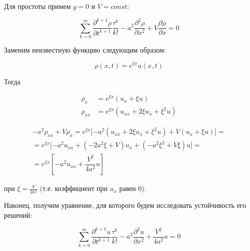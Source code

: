 Для простоты примем $g=0$ и $V=const$:

\begin{equation}
\sum\limits_{k=0}^{m} \dfrac{\partial^{k+1} \rho}{\partial t^{k+1}} \dfrac{\tau^k}{k!} - a^2 \dfrac{\partial^2 \rho}{\partial x^2} + V \dfrac{\partial \rho}{\partial x} = 0
\end{equation}

Заменим неизвестную функцию следующим образом:

\begin{equation*}
\rho (x,t) = e^{\xi x} u(x,t)
\end{equation*}

Тогда

\begin{align*}
\rho_x & = e^{\xi x} (u_x + \xi u)\\
\rho_{xx} & = e^{\xi x} (u_{xx} + 2 \xi u_x + \xi^2 u)
\end{align*}

\begin{align*}
- a^2 \rho_{xx} + V \rho_x = e^{\xi x} \lbrack -a^2 (u_{xx} + 2 \xi u_x + \xi^2 u) + V (u_x + \xi u) \rbrack = \\
= e^{\xi x} \lbrack -a^2 u_{xx} + (-2 a^2 \xi + V) u_x + (-a^2 \xi^2 + V \xi) u \rbrack = \\
= e^{\xi x} \left\lbrack -a^2 u_{xx} + \dfrac{V^2}{4a^2} u \right\rbrack
\end{align*}

при $\xi = \frac{V}{2a^2}$ (т.е. коэффициент при $u_x$ равен $0$).

Наконец, получим уравнение, для которого будем исследовать устойчивость его решений:

\begin{equation}\label{eq:final}
    \sum\limits_{k=0}^{m} \dfrac{\partial^{k+1} u}{\partial t^{k+1}} \dfrac{\tau^k}{k!} - a^2 \dfrac{\partial^2 u}{\partial x^2} + \dfrac{V^2}{4a^2} u = 0
\end{equation}
